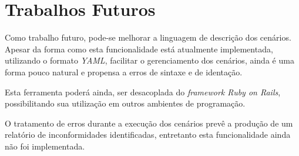 \section{Trabalhos Futuros}

Como trabalho futuro, pode-se melhorar a linguagem de descrição dos cenários. Apesar da forma como esta funcionalidade está atualmente implementada, utilizando o formato \textit{YAML}, facilitar o gerenciamento dos cenários, ainda é uma forma pouco natural e propensa a erros de sintaxe e de identação.

Esta ferramenta poderá ainda, ser desacoplada do \textit{framework Ruby on Rails}, possibilitando sua utilização em outros ambientes de programação.

O tratamento de erros durante a execução dos cenários prevê a produção de um relatório de inconformidades identificadas, entretanto esta funcionalidade ainda não foi implementada.